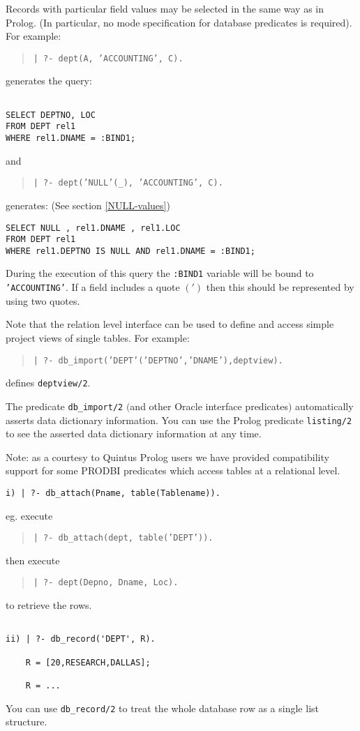 Records with particular field values may be selected in the same way
as in Prolog.  (In particular, no mode specification for database predicates is
required). For example:
\begin{quote}

{\tt | ?- dept(A, 'ACCOUNTING', C).}
\end{quote}
generates the query:
\begin{verbatim}

SELECT DEPTNO, LOC
FROM DEPT rel1
WHERE rel1.DNAME = :BIND1;
\end{verbatim}
and 
\begin{quote}

{\tt | ?- dept('NULL'(\_), 'ACCOUNTING', C).}
\end{quote}
generates: (See section \ref{NULL-values})
\begin{verbatim}
SELECT NULL , rel1.DNAME , rel1.LOC
FROM DEPT rel1
WHERE rel1.DEPTNO IS NULL AND rel1.DNAME = :BIND1;
\end{verbatim}
During the execution of this query the {\tt :BIND1} variable will be bound
to {\tt 'ACCOUNTING'}.\newline
If a field includes a quote $(')$ then this should be represented by
using two quotes.

Note that the relation level interface can be used to define and
access simple project views of single tables.  For example:
\begin{quote}

{\tt | ?- db\_import('DEPT'('DEPTNO','DNAME'),deptview).}
\end{quote}
defines {\tt deptview/2}.

The predicate {\tt db\_import/2} $($and other Oracle interface
predicates$)$ automatically asserts data dictionary information.  You
can use the Prolog predicate {\tt listing/2} to see the asserted data
dictionary information at any time.  


Note: as a courtesy to Quintus Prolog users we have provided
compatibility support for some PRODBI predicates which access tables
at a relational level.

\begin{verbatim}
i) | ?- db_attach(Pname, table(Tablename)).
\end{verbatim}

eg. execute 
\begin{quote}
{\tt | ?- db\_attach(dept, table('DEPT')).} 
\end{quote}
then execute 
\begin{quote}	
{\tt | ?- dept(Depno, Dname, Loc).}
\end{quote}
to retrieve the rows.
\begin{verbatim}

ii) | ?- db_record('DEPT', R).

    R = [20,RESEARCH,DALLAS];

    R = ...

\end{verbatim}
    You can use {\tt db\_record/2} to treat the whole database row as a single list structure.



